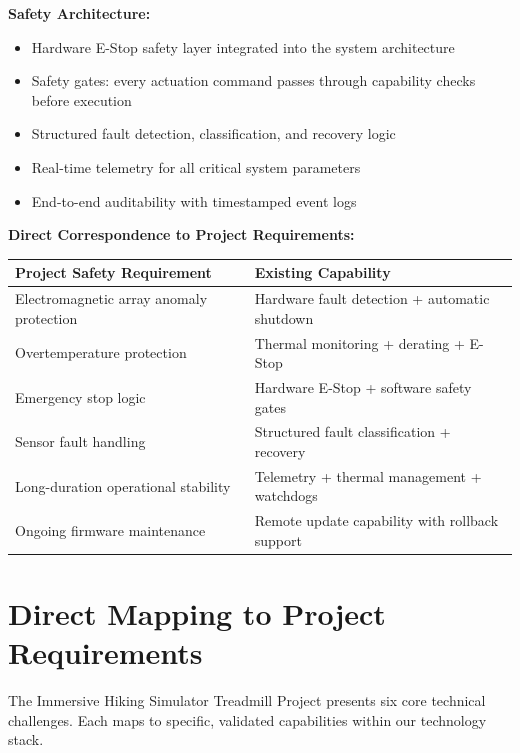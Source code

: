 \documentclass[a4paper,11pt]{article}
\begin{document}
\vspace{0.5em}
\noindent\textbf{Safety Architecture:}
\begin{itemize}
  \item Hardware E-Stop safety layer integrated into the system architecture
  \item Safety gates: every actuation command passes through capability checks before execution
  \item Structured fault detection, classification, and recovery logic
  \item Real-time telemetry for all critical system parameters
  \item End-to-end auditability with timestamped event logs
\end{itemize}

\vspace{0.5em}
\noindent\textbf{Direct Correspondence to Project Requirements:}

\begin{center}
\begin{tabularx}{\textwidth}{X X}
\toprule
\textbf{Project Safety Requirement} & \textbf{Existing Capability} \\
\midrule
Electromagnetic array anomaly protection & Hardware fault detection + automatic shutdown \\
Overtemperature protection & Thermal monitoring + derating + E-Stop \\
Emergency stop logic & Hardware E-Stop + software safety gates \\
Sensor fault handling & Structured fault classification + recovery \\
Long-duration operational stability & Telemetry + thermal management + watchdogs \\
Ongoing firmware maintenance & Remote update capability with rollback support \\
\bottomrule
\end{tabularx}
\end{center}

\section{Direct Mapping to Project Requirements}

The Immersive Hiking Simulator Treadmill Project presents six core technical challenges. Each maps to specific, validated capabilities within our technology stack.
\end{document}
